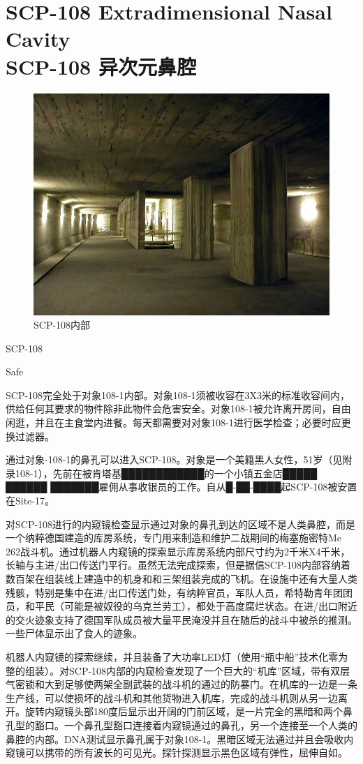 \chapter[SCP-108 异次元鼻腔]{
    SCP-108 Extradimensional Nasal Cavity\\
    SCP-108 异次元鼻腔
}

\label{chap:SCP-108}

\begin{figure}[H]
    \centering
    \includegraphics[width=0.5\linewidth]{images/SCP.108.jpg}
    \caption*{SCP-108内部}
\end{figure}

SCP-108

Safe

SCP-108完全处于对象108-1内部。对象108-1须被收容在3X3米的标准收容间内，供给任何其要求的物件除非此物件会危害安全。对象108-1被允许离开房间，自由闲逛，并且在主食堂内进餐。每天都需要对对象108-1进行医学检查；必要时应更换过滤器。

通过对象-108-1的鼻孔可以进入SCP-108。对象是一个美籍黑人女性，51岁（见附录108-1），先前在被肯塔基████████████的一个小镇五金店█████ ██████ ███████雇佣从事收银员的工作。自从█-██-████起SCP-108被安置在Site-17。

对SCP-108进行的内窥镜检查显示通过对象的鼻孔到达的区域不是人类鼻腔，而是一个纳粹德国建造的库房系统，专门用来制造和维护二战期间的梅塞施密特Me 262战斗机。通过机器人内窥镜的探索显示库房系统内部尺寸约为2千米X4千米，长轴与主进\slash 出口传送门平行。虽然无法完成探索，但是据信SCP-108内部容纳着数百架在组装线上建造中的机身和和三架组装完成的飞机。在设施中还有大量人类残骸，特别是集中在进\slash 出口传送门处，有纳粹官员，军队人员，希特勒青年团团员，和平民（可能是被奴役的乌克兰劳工），都处于高度腐烂状态。在进\slash 出口附近的交火迹象支持了德国军队成员被大量平民淹没并且在随后的战斗中被杀的推测。一些尸体显示出了食人的迹象。

机器人内窥镜的探索继续，并且装备了大功率LED灯（使用“瓶中船”技术化零为整的组装）。对SCP-108内部的内窥检查发现了一个巨大的“机库”区域，带有双层气密锁和大到足够使两架全副武装的战斗机的通过的防暴门。在机库的一边是一条生产线，可以使损坏的战斗机和其他货物进入机库，完成的战斗机则从另一边离开。旋转内窥镜头部180度后显示出开阔的门前区域，是一片完全的黑暗和两个鼻孔型的豁口。一个鼻孔型豁口连接着内窥镜通过的鼻孔，另一个连接至一个人类的鼻腔的内部。DNA测试显示鼻孔属于对象108-1。黑暗区域无法通过并且会吸收内窥镜可以携带的所有波长的可见光。探针探测显示黑色区域有弹性，屈伸自如。

